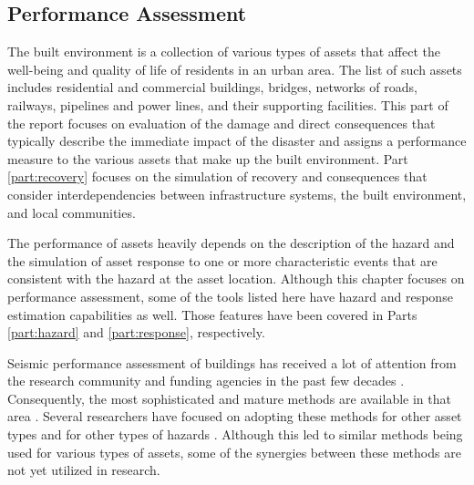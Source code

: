 
\begin{partbacktext}
\part{Performance Assessment}\label{part:Performance}

The built environment is a collection of various types of assets that affect the well-being and quality of life of residents in an urban area. The list of such assets includes residential and commercial buildings, bridges, networks of roads, railways, pipelines and power lines, and their supporting facilities. This part of the report focuses on evaluation of the damage and direct consequences that typically describe the immediate impact of the disaster and assigns a performance measure to the various assets that make up the built environment. Part \ref{part:recovery} focuses on the simulation of recovery and consequences that consider interdependencies between infrastructure systems, the built environment, and local communities.

The performance of assets heavily depends on the description of the hazard and the simulation of asset response to one or more characteristic events that are consistent with the hazard at the asset location. Although this chapter focuses on performance assessment, some of the tools listed here have hazard and response estimation capabilities as well. Those features have been covered in Parts \ref{part:hazard} and \ref{part:response}, respectively. 

Seismic performance assessment of buildings has received a lot of attention from the research community and funding agencies in the past few decades \citep{atc1985atc13, fema1997guidelines, fajfar2004performancebased, kircher2006hazus}. Consequently, the most sophisticated and mature methods are available in that area \citep{atc2012p-58}. Several researchers have focused on adopting these methods for other asset types \citep{werner2006redars, chmielewski2016response} and for other types of hazards \citep{vickery2006hazus, bernardini2015performance, attary2017performancebased, barbato2013performancebased, lange2014application}. Although this led to similar methods being used for various types of assets, some of the synergies between these methods are not yet utilized in research.


\end{partbacktext}
